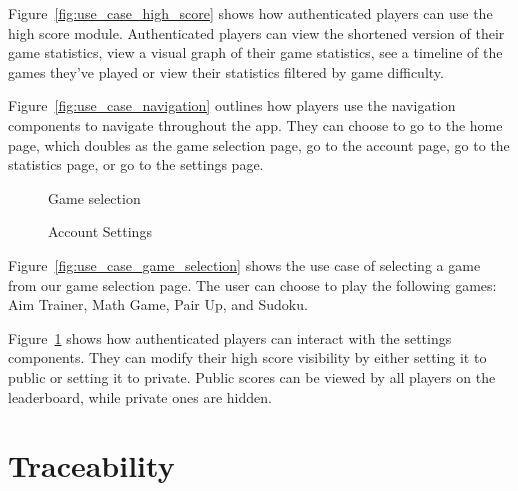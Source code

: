 \documentclass[11pt,a4paper]{article}
\newcommand{\inputdiagram}[1]{}
\newcommand{\textwidthdiagram}[2][1]{%
  \resizebox{#1\textwidth}{!}{\inputdiagram{#2}}%
}
\begin{document}
Figure~\ref{fig:use_case_high_score} shows how authenticated players can use the high score module. Authenticated players can view the shortened version of their game statistics, view a visual graph of their game statistics, see a timeline of the games they've played or view their statistics filtered by game difficulty.

Figure~\ref{fig:use_case_navigation} outlines how players use the navigation components to navigate throughout the app. They can choose to go to the home page, which doubles as the game selection page, go to the account page, go to the statistics page, or go to the settings page.

\begin{figure}[H]
    \begin{minipage}[b]{0.48\textwidth}
        \centering
        \textwidthdiagram{use_case_game_selection.tex}
        \caption{Game selection}
        \label{fig:use_case_game_selection}
    \end{minipage}
    \hfil
    \begin{minipage}[b]{0.48\textwidth}
        \centering
        \textwidthdiagram{use_case_settings.tex}
        \caption{Account Settings}
        \label{fig:use_case_settings}
    \end{minipage}
\end{figure}
Figure~\ref{fig:use_case_game_selection} shows the use case of selecting a game from our game selection page. The user can choose to play the following games: Aim Trainer, Math Game, Pair Up, and Sudoku.

Figure~\ref{fig:use_case_settings} shows how authenticated players can interact with the settings components. They can modify their high score visibility by either setting it to public or setting it to private. Public scores can be viewed by all players on the leaderboard, while private ones are hidden.


\section{Traceability}
\end{document}
